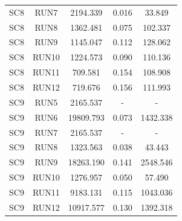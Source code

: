 \documentclass[
  12pt,
]{article}
\begin{document}
\begin{table}
{\begin{tabular}[t]{lcccc}
SC8 & RUN7 & 2194.339 & 0.016 & 33.849\\
SC8 & RUN8 & 1362.481 & 0.075 & 102.337\\
SC8 & RUN9 & 1145.047 & 0.112 & 128.062\\
SC8 & RUN10 & 1224.573 & 0.090 & 110.136\\
\addlinespace
SC8 & RUN11 & 709.581 & 0.154 & 108.908\\
SC8 & RUN12 & 719.676 & 0.156 & 111.993\\
SC9 & RUN5 & 2165.537 & - & -\\
SC9 & RUN6 & 19809.793 & 0.073 & 1432.338\\
SC9 & RUN7 & 2165.537 & - & -\\
\addlinespace
SC9 & RUN8 & 1323.563 & 0.038 & 43.443\\
SC9 & RUN9 & 18263.190 & 0.141 & 2548.546\\
SC9 & RUN10 & 1276.957 & 0.050 & 57.490\\
SC9 & RUN11 & 9183.131 & 0.115 & 1043.036\\
SC9 & RUN12 & 10917.577 & 0.130 & 1392.318\\
\bottomrule
\end{tabular}}
\end{table}

\begingroup\fontsize{8}{10}\selectfont
\end{document}
